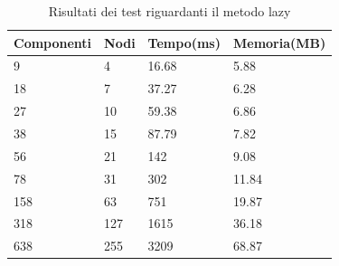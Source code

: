 \begin{table}[htbp] 
\begin{tabularx}{\textwidth}{X X X X}
\hline
Componenti & Nodi & Tempo(ms) & Memoria(MB)\\
\hline
9   &   4 & 16.68 &  5.88\\
18  &   7 & 37.27 &  6.28\\
27  &  10 & 59.38 &  6.86\\
38  &  15 & 87.79 &  7.82\\    
56  &  21 &   142 &  9.08\\
78  &  31 &   302 & 11.84\\
158 &  63 &   751 & 19.87\\
318 & 127 &  1615 & 36.18\\
638 & 255 &  3209 & 68.87\\
\hline
\end{tabularx}
\caption{Risultati dei test riguardanti il metodo lazy}
\label{tab:lazy_test}
\end{table}


